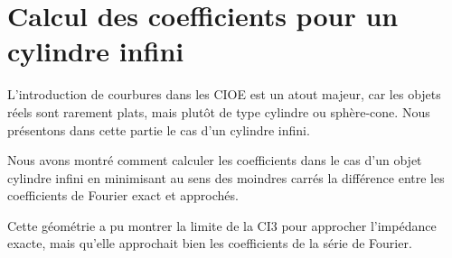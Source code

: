 \chapter{Calcul des coefficients pour un cylindre infini}
\label{sec:cylindre}
\minitoc
\newpage
{}
L'introduction de courbures dans les CIOE est un atout majeur, car les objets réels sont rarement plats, mais plutôt de type cylindre ou sphère-cone. Nous présentons dans cette partie le cas d'un cylindre infini.







Nous avons montré comment calculer les coefficients dans le cas d'un objet cylindre infini en minimisant au sens des moindres carrés la différence entre les coefficients de Fourier exact et approchés. 

Cette géométrie a pu montrer la limite de la CI3 pour approcher l'impédance exacte, mais qu'elle approchait bien les coefficients de la série de Fourier.
